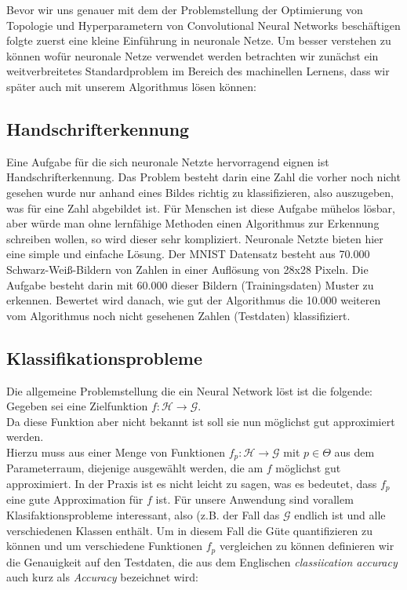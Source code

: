 \documentclass[]{scrartcl}
\begin{document}
	Bevor wir uns genauer mit dem der Problemstellung der Optimierung von Topologie und Hyperparametern von Convolutional Neural Networks beschäftigen folgte zuerst eine kleine Einführung in neuronale Netze.
	Um besser verstehen zu können wofür neuronale Netze verwendet werden betrachten wir zunächst ein weitverbreitetes Standardproblem im Bereich des machinellen Lernens,
	dass wir später auch mit unserem Algorithmus lösen können:

	\subsection{Handschrifterkennung}\label{mnist}

		Eine Aufgabe für die sich neuronale Netzte hervorragend eignen ist Handschrifterkennung.
		Das Problem besteht darin eine Zahl die vorher noch nicht gesehen wurde nur anhand eines Bildes richtig zu klassifizieren, also auszugeben, was für eine Zahl abgebildet ist.
		Für Menschen ist diese Aufgabe mühelos lösbar, aber würde man ohne lernfähige Methoden einen Algorithmus zur Erkennung schreiben wollen, so wird dieser sehr kompliziert.
		Neuronale Netzte bieten hier eine simple und einfache Lösung.
		Der MNIST Datensatz \cite{mnist_data} besteht aus 70.000 Schwarz-Weiß-Bildern von Zahlen in einer Auflösung von 28x28 Pixeln. Die Aufgabe besteht darin mit 60.000 dieser Bildern (Trainingsdaten)
		Muster zu erkennen. Bewertet wird danach, wie gut der Algorithmus die 10.000 weiteren vom Algorithmus noch nicht gesehenen Zahlen (Testdaten) klassifiziert.

	\subsection{Klassifikationsprobleme}

		Die allgemeine Problemstellung die ein Neural Network löst ist die folgende:\\
		Gegeben sei eine Zielfunktion $f:\mathcal{H} \to \mathcal{G}$.\\
		Da diese Funktion aber nicht bekannt ist soll sie nun möglichst gut approximiert werden. \\
		Hierzu muss aus einer Menge von Funktionen $f_p:\mathcal{H} \to \mathcal{G}$ mit $p \in \Theta$ aus dem Parameterraum, diejenige ausgewählt werden, die am $f$ möglichst gut approximiert.
		In der Praxis ist es nicht leicht zu sagen, was es bedeutet, dass $f_p$ eine gute Approximation für $f$ ist.
		Für unsere Anwendung sind vorallem Klasifaktionsprobleme interessant, also (z.B. der Fall das $\mathcal{G}$ endlich ist und alle verschiedenen Klassen enthält.
		Um in diesem Fall die Güte quantifizieren zu können und um verschiedene Funktionen $f_p$ vergleichen zu können definieren wir die Genauigkeit auf den Testdaten,
		die aus dem Englischen \textit{classiication accuracy} auch kurz als \textit{Accuracy} bezeichnet wird:
\end{document}
